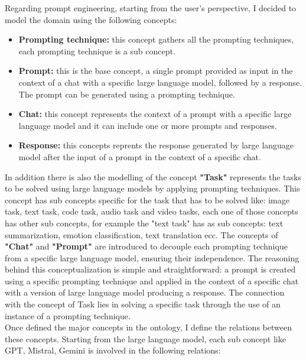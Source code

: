 Regarding prompt engineering, starting from the user's perspective, I decided to model the domain using the following concepts:
\begin{itemize}
    \item \textbf{Prompting technique:} this concept gathers all the prompting techniques, each prompting technique is a sub concept.

    \item \textbf{Prompt:} this is the base concept, a single prompt provided as input in the context of a chat with a specific large language model, followed by a response. The prompt can be generated using a prompting technique.

    \item \textbf{Chat:} this concept represents the context of a prompt with a specific large language model and it can include one or more prompts and responses.

    \item \textbf{Response:} this concepts reprents the response 
    generated by large language model after the input of a prompt in the context of a specific chat.
\end{itemize}
In addition there is also the modelling of the concept \textbf{"Task"} represents the tasks to be solved using large language models by applying prompting techniques. This concept has sub concepts specific for the task that has to be solved like: image task, text task, code task, audio task and video tasks, each one of those concepts has other sub concepts, for example the "text task" has as sub concepts: text summarization, emotion classification, text translation ecc. The concepts of \textbf{"Chat"} and \textbf{"Prompt"} are introduced to decouple each prompting technique from a specific large language model, ensuring their independence. The reasoning behind this conceptualization is simple and straightforward: a prompt is created using a specific prompting technique and applied in the context of a specific chat with a version of large language model producing a response. The connection with the concept of Task lies in solving a specific task through the use of an instance of a prompting technique.\\
Once defined the major concepts in the ontology, I define the relations between these concepts. Starting from the large language model, each sub concept like GPT, Mistral, Gemini is involved in the following relations:
